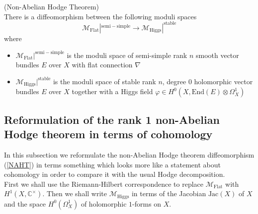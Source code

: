 \begin{theorem}(Non-Abelian Hodge Theorem)\\
There is a diffeomorphism between the following moduli spaces
    \begin{equation}\label{NAHT}
        \mathcal{M}_{\mathrm{Flat}}|^{\mathrm{semi-simple}}\rightarrow\mathcal{M}_{\mathrm{Higgs}}|^{\mathrm{stable}} 
    \end{equation}
where
\begin{itemize}
\item $\mathcal{M}_{\mathrm{Flat}}|^{\mathrm{semi-simple}}$ is the moduli space of semi-simple rank $n$ smooth vector bundles $E$ over $X$ with flat connection $\nabla$
\item $\mathcal{M}_{\mathrm{Higgs}}|^{\mathrm{stable}}$ is the moduli space of stable rank $n$, degree $0$ holomorphic vector bundles $E$ over $X$ together with a Higgs field $\varphi \in H^0 (X, \mathrm{End}(E) \otimes \Omega^1 _X) $
\end{itemize}
\end{theorem}



\subsection{Reformulation of the rank 1 non-Abelian Hodge theorem in terms of cohomology}

In this subsection we reformulate the non-Abelian Hodge theorem diffeomorphism (\ref{NAHT}) in terms something which looks more like a statement about cohomology in order to compare it with the usual Hodge decomposition.\\

First we shall use the Riemann-Hilbert correspondence to replace $\mathcal{M}_{\mathrm{Flat}}$ with $H^1(X, \mathbb{C} ^\times) $. Then we shall write $\mathcal{M}_{\mathrm{Higgs}}$ in terms of the Jacobian $\textrm{Jac}(X)$ of $X$ and the space $H^0 ( \Omega_X ^1 ) $ of holomorphic $1$-forms on $X$.\\

